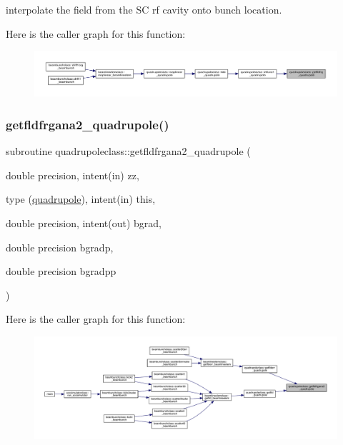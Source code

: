 interpolate the field from the SC rf cavity onto bunch location. 

Here is the caller graph for this function\+:\nopagebreak
\begin{figure}[H]
\begin{center}
\leavevmode
\includegraphics[width=350pt]{namespacequadrupoleclass_a28a961157d94669d59f8c6f024995899_icgraph}
\end{center}
\end{figure}
\mbox{\label{namespacequadrupoleclass_ab1abe8916ad3dace3e5d1373da4688ac}} 
\subsubsection{\texorpdfstring{getfldfrgana2\_quadrupole()}{getfldfrgana2\_quadrupole()}}
{\footnotesize\ttfamily subroutine quadrupoleclass\+::getfldfrgana2\+\_\+quadrupole (\begin{DoxyParamCaption}\item[{double precision, intent(in)}]{zz,  }\item[{type (\mbox{\hyperlink{namespacequadrupoleclass_structquadrupoleclass_1_1quadrupole}{quadrupole}}), intent(in)}]{this,  }\item[{double precision, intent(out)}]{bgrad,  }\item[{double precision}]{bgradp,  }\item[{double precision}]{bgradpp }\end{DoxyParamCaption})}

Here is the caller graph for this function\+:\nopagebreak
\begin{figure}[H]
\begin{center}
\leavevmode
\includegraphics[width=350pt]{namespacequadrupoleclass_ab1abe8916ad3dace3e5d1373da4688ac_icgraph}
\end{center}
\end{figure}
\mbox{\label{namespacequadrupoleclass_aac2c756ddd587ca842555670b0ad16b3}} 
